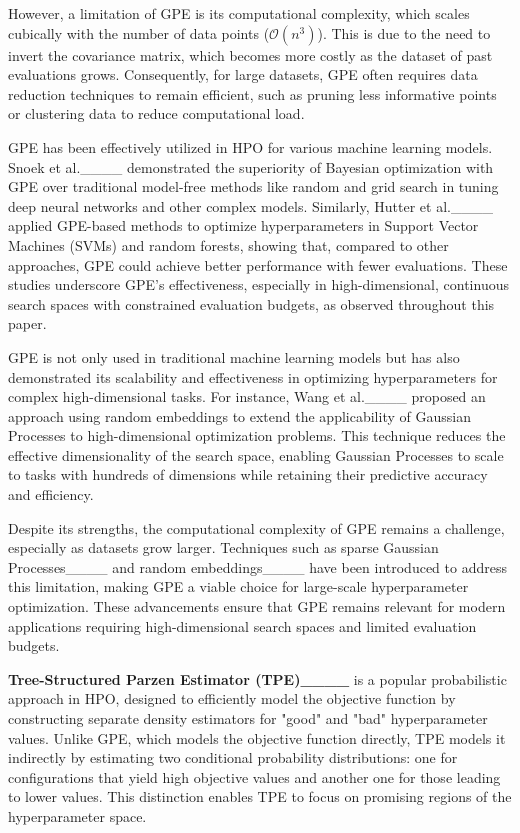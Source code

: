 However, a limitation of GPE is its computational complexity, which scales cubically with the number of data points ($\mathcal{O}(n^3)$). This is due to the need to invert the covariance matrix, which becomes more costly as the dataset of past evaluations grows. Consequently, for large datasets, GPE often requires data reduction techniques to remain efficient, such as pruning less informative points or clustering data to reduce computational load.

GPE has been effectively utilized in HPO for various machine learning models. Snoek et al.____ demonstrated the superiority of Bayesian optimization with GPE over traditional model-free methods like random and grid search in tuning deep neural networks and other complex models. Similarly, Hutter et al.____ applied GPE-based methods to optimize hyperparameters in Support Vector Machines (SVMs) and random forests, showing that, compared to other approaches, GPE could achieve better performance with fewer evaluations. These studies underscore GPE’s effectiveness, especially in high-dimensional, continuous search spaces with constrained evaluation budgets, as observed throughout this paper.

GPE is not only used in traditional machine learning models but has also demonstrated its scalability and effectiveness in optimizing hyperparameters for complex high-dimensional tasks. For instance, Wang et al.____ proposed an approach using random embeddings to extend the applicability of Gaussian Processes to high-dimensional optimization problems. This technique reduces the effective dimensionality of the search space, enabling Gaussian Processes to scale to tasks with hundreds of dimensions while retaining their predictive accuracy and efficiency.

Despite its strengths, the computational complexity of GPE remains a challenge, especially as datasets grow larger. Techniques such as sparse Gaussian Processes____ and random embeddings____ have been introduced to address this limitation, making GPE a viable choice for large-scale hyperparameter optimization. These advancements ensure that GPE remains relevant for modern applications requiring high-dimensional search spaces and limited evaluation budgets.

\textbf{Tree-Structured Parzen Estimator (TPE)____} is a popular probabilistic approach in HPO, designed to efficiently model the objective function by constructing separate density estimators for "good" and "bad" hyperparameter values. Unlike GPE, which models the objective function directly, TPE models it indirectly by estimating two conditional probability distributions: one for configurations that yield high objective values and another one for those leading to lower values. This distinction enables TPE to focus on promising regions of the hyperparameter space.

